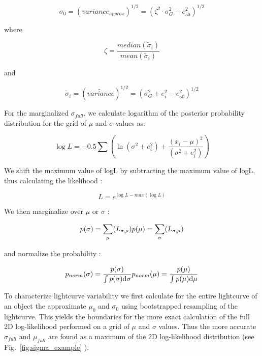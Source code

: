 \documentclass[fleqn,usenatbib]{mnras}  %
\begin{document}
\begin{equation}
\sigma_{0} = ( variance_{approx} )^{1/2} = (\zeta^{2} \cdot \sigma_{G}^{2} - e_{50} ^ {2})^{1/2}
\end{equation}

where 

\begin{equation}
\zeta = \frac{median(\widetilde{\sigma}_{i})} {mean(\widetilde{\sigma}_{i})}
\end{equation}

and 

\begin{equation}
\widetilde{\sigma}_{i} =  ( \widetilde{variance} )^{1/2} = ( \sigma_{G}^{2} + e_{i}^{2} - e_{50}^{2} )^{1/2}
\end{equation}


For the marginalized $\sigma_{full}$, we calculate logarithm of the posterior probability distribution for the grid of $\mu$ and $\sigma$ values as:

\begin{equation}
\log{L} = -0.5 \sum \left( \ln(\sigma^{2}+e_{i}^{2}) + \frac{(x_{i}-\mu)^{2}}{(\sigma^{2}+e_{i}^{2})} \right)
\end{equation}

We shift the maximum value of logL by subtracting the maximum value of logL, thus calculating the likelihood : 

\begin{equation}
L = e^{\log{L} - max(\log{L})}
\end{equation}

We then marginalize over $\mu$ or $\sigma$ : 

\begin{equation}
p(\sigma) = \sum_{\mu}(L_{\sigma,\mu}) \\
p(\mu) = \sum_{\sigma}(L_{\sigma,\mu})
\end{equation}

and normalize the probability :

\begin{equation}
p_{norm}(\sigma) = \frac{p(\sigma)}{ \int {p(\sigma) \text{d}\sigma}} \\ 
p_{norm}(\mu) = \frac{p(\mu)} {\int {p(\mu) \text{d}\mu} }
\end{equation}


To characterize  lightcurve variability we first calculate for the entire lightcurve of an object  the approximate $\mu_{0}$ and $\sigma_{0}$ using bootstrapped resampling of the lightcurve.  This yields the boundaries for the more exact calculation of the full 2D log-likelihood performed on a grid of $\mu$ and $\sigma$ values. Thus the more accurate $\sigma_{full}$ and $\mu_{full}$ are found as a maximum of the 2D log-likelihood distribution (see Fig.~\ref{fig:sigma_example} ).
\end{document}
